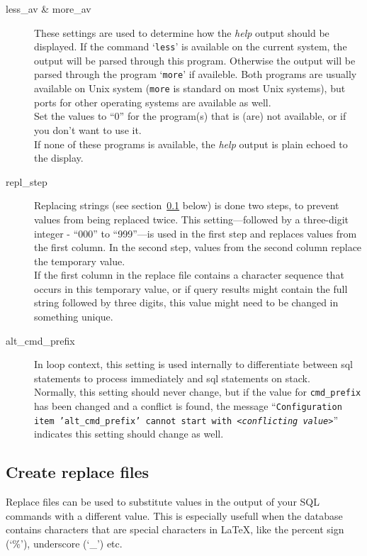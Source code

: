 \documentclass{article}
\begin{document}
\begin{description}
\item[less\_av \& more\_av] These settings are used to determine how the \textsl{help} output should be displayed. If the command `\texttt{less}' is available on the current system, the output will be parsed through this program. Otherwise the output will be parsed through the program `\texttt{more}' if availeble. Both programs are usually available on Unix system (\texttt{more} is standard on most Unix systems), but ports for other
operating systems are available as well.\\
Set the values to ``0'' for the program(s) that is (are) not available, or if you don't want to use it.\\
If none of these programs is available, the \textsl{help} output is plain echoed to the display.

\item[repl\_step] Replacing strings (see section~\ref{replfiles} below) is done two steps, to prevent values from being replaced twice.
This setting---followed by a three-digit integer - ``000'' to ``999''---is used in the first step and replaces values from the first column.
In the second step, values from the second column replace the temporary value. \\
If the first column in the replace file contains a character sequence that occurs in this temporary value, or if query results might contain the full string followed by three digits, this value might need to be changed in something unique.

\item[alt\_cmd\_prefix] In loop context, this setting is used internally to differentiate between sql statements to process immediately and sql statements on stack.\\
Normally, this setting should never change, but if the value for \texttt{cmd\_prefix} has been changed and a conflict is found, the message ``\texttt{Configuration item 'alt\_cmd\_prefix' cannot start with \textit{<conflicting value>}}'' indicates this setting should change as well.

\end{description}

\subsection{Create replace files}\label{replfiles}

Replace files can be used to substitute values in the output of your SQL commands with a different value. This is especially usefull when the database
contains characters that are special characters in \LaTeX, like the percent sign (`\%'), underscore (`\_') etc.
\end{document}
